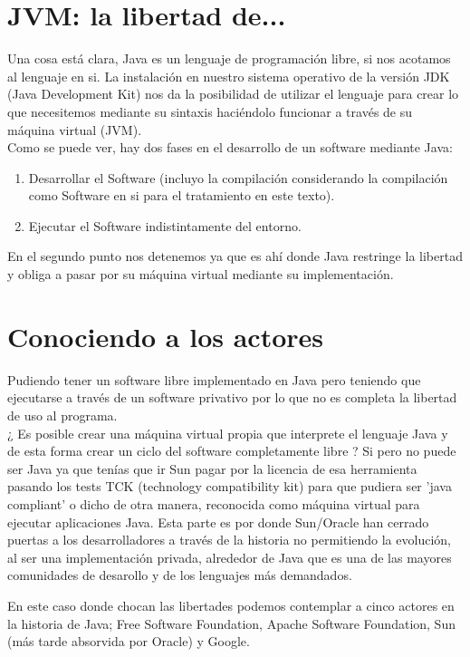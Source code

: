 \documentclass[11pt]{scrartcl}
\begin{document}
\section{JVM: la libertad de...}

Una cosa está clara, Java es un lenguaje de programación libre, si nos acotamos al lenguaje en si. La instalación en nuestro sistema operativo de la versión JDK (Java Development Kit) nos da la posibilidad de utilizar el lenguaje para crear lo que necesitemos mediante su sintaxis haciéndolo funcionar a través de su máquina virtual (JVM).\\
Como se puede ver, hay dos fases en el desarrollo de un software mediante Java:
\begin{enumerate}
\item Desarrollar el Software (incluyo la compilación considerando la compilación como Software en si para el tratamiento en este texto).
\item Ejecutar el Software indistintamente del entorno.
\end{enumerate}

En el segundo punto nos detenemos ya que es ahí donde Java restringe la libertad y obliga a pasar por su máquina virtual mediante su implementación.

\section{Conociendo a los actores}

Pudiendo tener un software libre implementado en Java pero teniendo que ejecutarse a través de un software privativo por lo que no es completa la libertad de uso al programa.\\
¿ Es posible crear una máquina virtual propia que interprete el lenguaje Java y de esta forma crear un ciclo del software completamente libre ? Si pero no puede ser Java ya que tenías que ir Sun pagar por la licencia de esa herramienta pasando los tests TCK (technology compatibility kit) para que pudiera ser 'java compliant' o dicho de otra manera, reconocida como máquina virtual para ejecutar aplicaciones Java.
Esta parte es por donde Sun/Oracle han cerrado puertas a los desarrolladores a través de la historia no permitiendo la evolución, al ser una implementación privada, alrededor de Java que es una de las mayores comunidades de desarollo y de los lenguajes más demandados.

En este caso donde chocan las libertades podemos contemplar a cinco actores en la historia de Java; Free Software Foundation, Apache Software Foundation, Sun (más tarde absorvida por Oracle) y Google.
\end{document}

